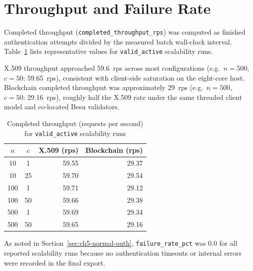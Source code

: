 
\section{Throughput and Failure Rate}
\label{sec:ch5-throughput}

Completed throughput (\texttt{completed\_throughput\_rps}) was computed as finished authentication attempts divided by the measured batch wall-clock interval. Table~\ref{tab:ch5-throughput} lists representative values for \texttt{valid\_active} scalability runs.

X.509 throughput approached 59.6~rps across most configurations (e.g.\ $n=500$, $c=50$: 59.65~rps), consistent with client-side saturation on the eight-core host. Blockchain completed throughput was approximately 29~rps (e.g.\ $n=500$, $c=50$: 29.16~rps), roughly half the X.509 rate under the same threaded client model and co-located Besu validators.

\begin{table}[htbp]
    \centering
    \caption{Completed throughput (requests per second) for \texttt{valid\_active} scalability runs}
    \label{tab:ch5-throughput}
    \begin{tabular}{|c|c|r|r|}
        \hline
        \textbf{$n$} & \textbf{$c$} & \textbf{X.509 (rps)} & \textbf{Blockchain (rps)} \\
        \hline
        10  & 1  & 59.55 & 29.37 \\
        10  & 25 & 59.70 & 29.54 \\
        100 & 1  & 59.71 & 29.12 \\
        100 & 50 & 59.66 & 29.38 \\
        500 & 1  & 59.69 & 29.34 \\
        500 & 50 & 59.65 & 29.16 \\
        \hline
    \end{tabular}
\end{table}

As noted in Section~\ref{sec:ch5-normal-auth}, \texttt{failure\_rate\_pct} was 0.0 for all reported scalability runs because no authentication timeouts or internal errors were recorded in the final export.
